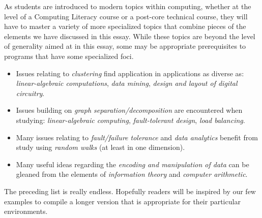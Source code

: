 As students are introduced to modern topics within computing, whether
at the level of a Computing Literacy course or a post-core technical
course, they will have to master a variety of more specialized topics
that combine pieces of the elements we have discussed in this essay.
While these topics are beyond the level of generality aimed at in this
essay, some may be appropriate prerequisites to programs that have
some specialized foci.
\begin{itemize}
\item
Issues relating to {\em clustering} find application in applications as
diverse as: {\em linear-algebraic computations}, {\em data mining},
{\em design and layout of digital circuitry}.

\item
Issues building on {\em graph separation/decomposition} are
encountered when studying: {\em linear-algebraic computing}, {\em
  fault-tolerant design}, {\em load balancing}.

\item
Many issues relating to {\em fault/failure tolerance} and {\em data
  analytics} benefit from study using {\em random walks} (at least in
one dimension).

\item
Many useful ideas regarding the {\em encoding and manipulation of
  data} can be gleaned from the elements of {\em information theory}
and {\em computer arithmetic}.
\end{itemize}
The preceding list is really endless.  Hopefully readers will be
inspired by our few examples to compile a longer version that is
appropriate for their particular environments.

